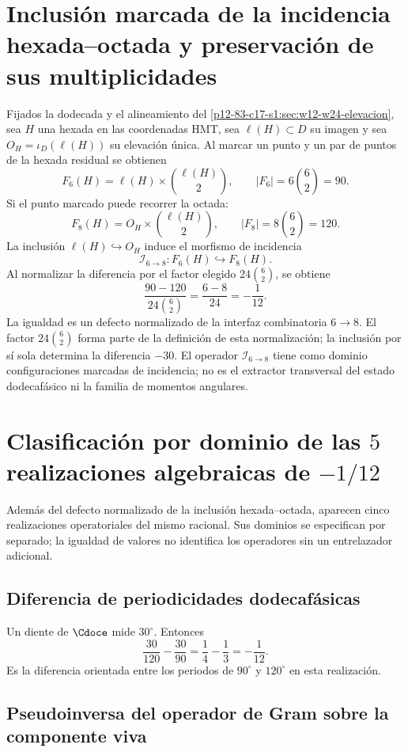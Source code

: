 \section{Inclusión marcada de la incidencia hexada--octada y preservación de sus multiplicidades}

Fijados la dodecada y el alineamiento del
\cref{p12-83-c17-s1:sec:w12-w24-elevacion}, sea \(H\) una hexada en las coordenadas HMT,
sea \(\ell(H)\subset D\) su imagen y sea
\(O_H=\iota_D(\ell(H))\) su elevación única. Al marcar un punto
y un par de puntos de la hexada residual se obtienen
\[
F_6(H)=\ell(H)\times\binom{\ell(H)}2,
\qquad
|F_6|=6\binom62=90.
\]
Si el punto marcado puede recorrer la octada:
\[
F_8(H)=O_H\times\binom{\ell(H)}2,
\qquad
|F_8|=8\binom62=120.
\]
La inclusión \(\ell(H)\hookrightarrow O_H\) induce el morfismo de incidencia
\[
 \mathcal I_{6\to8}:F_6(H)\hookrightarrow F_8(H).
\]
Al normalizar la diferencia por el factor
elegido \(24\binom62\), se obtiene
\[
\boxed{
\frac{90-120}{24\binom62}
=\frac{6-8}{24}
=-\frac1{12}.}
\]
La igualdad es un defecto normalizado de la interfaz combinatoria
\(6\to8\). El factor \(24\binom62\) forma parte de la definición de esta
normalización; la inclusión por sí sola determina la diferencia \(-30\).
El operador \(\mathcal I_{6\to8}\) tiene como dominio configuraciones
marcadas de incidencia; no es el extractor transversal del estado
dodecafásico ni la familia de momentos angulares.

\section{Clasificación por dominio de las \(5\) realizaciones algebraicas de \(-1/12\)}

Además del defecto normalizado de la inclusión hexada--octada, aparecen
cinco realizaciones operatoriales del mismo racional. Sus dominios se
especifican por separado; la igualdad de valores no identifica los
operadores sin un entrelazador adicional.

\subsection{Diferencia de periodicidades dodecafásicas}

Un diente de \(\Cdoce\) mide \(30^\circ\). Entonces
\[
\frac{30}{120}-\frac{30}{90}
=\frac14-\frac13
=-\frac1{12}.
\]
Es la diferencia orientada entre los periodos de \(90^\circ\) y
\(120^\circ\) en esta realización.

\subsection{Pseudoinversa del operador de Gram sobre la componente viva}

